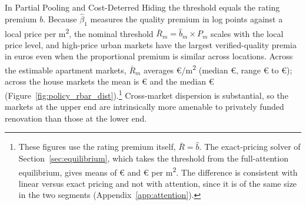 In Partial Pooling and Cost-Deterred Hiding the threshold equals the rating premium $b$. Because $\hat\beta_1$ measures the quality premium in log points against a local price per m\textsuperscript{2}, the nominal threshold $\bar R_m=\hat b_m\times P_m$ scales with the local price level, and high-price urban markets have the largest verified-quality premia in euros even when the proportional premium is similar across locations. Across the \attNMarketsApt{} estimable apartment markets, $\bar R_m$ averages \euro{}\attScBaseRbarApt{}/m\textsuperscript{2} (median \euro{}\attBaseRbarMedApt{}, range \euro{}\attBaseRbarMinApt{} to \euro{}\attBaseRbarMaxApt{}); across the \attNMarketsHouse{} house markets the mean is \euro{}\attScBaseRbarHouse{} and the median \euro{}\attBaseRbarMedHouse{} (Figure~\ref{fig:policy_rbar_dist}).\footnote{These figures use the rating premium itself, $\bar R=\hat b$. The exact-pricing solver of Section~\ref{sec:equilibrium}, which takes the threshold from the full-attention equilibrium, gives means of \euro{}\attRbarCoreEurTwoFiftyApt{} and \euro{}\attRbarCoreEurTwoFiftyHouse{} per m\textsuperscript{2}. The difference is consistent with linear versus exact pricing and not with attention, since it is of the same size in the two segments (Appendix~\ref{app:attention}).} Cross-market dispersion is substantial, so the markets at the upper end are intrinsically more amenable to privately funded renovation than those at the lower end.
